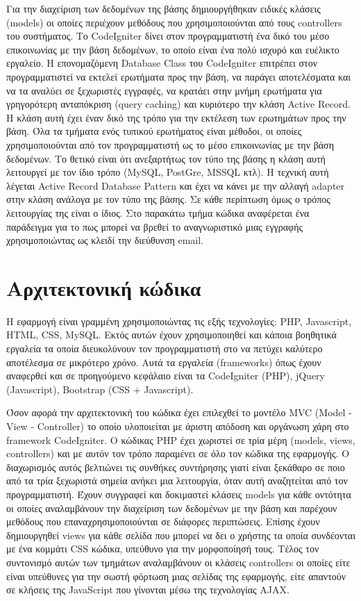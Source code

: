 Για την διαχείριση των δεδομένων της βάσης δημιουργήθηκαν ειδικές κλάσεις (models) οι οποίες περιέχουν μεθόδους που χρησιμοποιούνται από τους controllers του συστήματος. Το CodeIgniter δίνει στον προγραμματιστή ένα δικό του μέσο επικοινωνίας με την βάση δεδομένων, το οποίο είναι ένα πολύ ισχυρό και ευέλικτο εργαλείο. Η επονομαζόμενη Database Class του CodeIgniter επιτρέπει στον προγραμματιστεί να εκτελεί ερωτήματα προς την βάση, να παράγει αποτελέσματα και να τα αναλύει σε ξεχωριστές εγγραφές, να κρατάει στην μνήμη ερωτήματα για γρηγορότερη ανταπόκριση (query caching) και κυριότερο την κλάση Active Record. Η κλάση αυτή έχει έναν δικό της τρόπο για την εκτέλεση των ερωτημάτων προς την βάση. Όλα τα τμήματα ενός τυπικού ερωτήματος είναι μέθοδοι, οι οποίες χρησιμοποιούνται από τον προγραμματιστή ως το μέσο επικοινωνίας με την βάση δεδομένων. Το θετικό είναι ότι ανεξαρτήτως τον τύπο της βάσης η κλάση αυτή λειτουργεί με τον ίδιο τρόπο (MySQL, PostGre, MSSQL κτλ). Η τεχνική αυτή λέγεται Active Record Database Pattern και έχει να κάνει με την αλλαγή adapter στην κλάση ανάλογα με τον τύπο της βάσης. Σε κάθε περίπτωση όμως ο τρόπος λειτουργίας της είναι ο ίδιος. Στο παρακάτω τμήμα κώδικα αναφέρεται ένα παράδειγμα για το πως μπορεί να βρεθεί το αναγνωριστικό μιας εγγραφής χρησιμοποιώντας ως κλειδί την διεύθυνση email.



\section{Αρχιτεκτονική κώδικα}
Η εφαρμογή είναι γραμμένη χρησιμοποιώντας τις εξής τεχνολογίες: PHP, Javascript, HTML, CSS, MySQL. Εκτός αυτών έχουν χρησιμοποιηθεί και κάποια βοηθητικά εργαλεία τα οποία διευκολύνουν τον προγραμματιστή στο να πετύχει καλύτερο αποτέλεσμα σε μικρότερο χρόνο. Αυτά τα εργαλεία (frameworks) όπως έχουν αναφερθεί και σε προηγούμενο κεφάλαιο είναι τα CodeIgniter (PHP), jQuery (Javascript), Bootstrap (CSS + Javascript). 

Όσον αφορά την αρχιτεκτονική του κώδικα έχει επιλεχθεί το μοντέλο MVC (Model - View - Controller) το οποίο υλοποιείται με άριστη απόδοση και οργάνωση χάρη στο framework CodeIgniter. Ο κώδικας PHP έχει χωριστεί σε τρία μέρη (models, views, controllers) και με αυτόν τον τρόπο παραμένει σε όλο τον κώδικα της εφαρμογής. Ο διαχωρισμός αυτός βελτιώνει τις συνθήκες συντήρησης γιατί είναι ξεκάθαρο σε ποιο από τα τρία ξεχωριστά σημεία ανήκει μια λειτουργία, όταν αυτή αναζητείται από τον προγραμματιστή. Έχουν συγγραφεί και δοκιμαστεί κλάσεις models για κάθε οντότητα οι οποίες αναλαμβάνουν την διαχείριση των δεδομένων με την βάση και παρέχουν μεθόδους που επαναχρησιμοποιούνται σε διάφορες περιπτώσεις. Επίσης έχουν δημιουργηθεί views για κάθε σελίδα που μπορεί να δει ο χρήστης τα οποία συνδέονται με ένα κομμάτι CSS κώδικα, υπεύθυνο για την μορφοποίησή τους. Τέλος τον συντονισμό αυτών των τμημάτων αναλαμβάνουν οι κλάσεις controllers οι οποίες είτε είναι υπεύθυνες για την σωστή φόρτωση μιας σελίδας της εφαρμογής, είτε απαντούν σε κλήσεις της JavaScript που γίνονται μέσω της τεχνολογίας AJAX.

